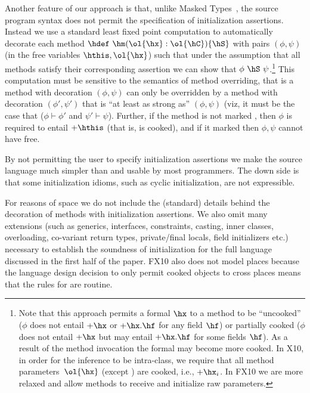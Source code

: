 Another feature of our approach is that, unlike Masked
Types~\cite{XinQi:2009}, the source program syntax does not permit the
specification of initialization assertions. Instead we use a standard
least fixed point computation to automatically decorate each method
$\hdef~\hm(\ol{\hx}:\ol{\hC})\{\hS\}$ with pairs $(\phi, \psi)$ (in the free
variables $\hthis, \ol{\hx}$) such that under the assumption that all
methods satisfy their corresponding assertion we can show that
$\phi~\hS~\psi$.\footnote{Note that this approach permits a formal $\hx$ to a
  method to be ``uncooked'' ($\phi$ does not entail $+\hx$ or
  $+\hx.\hf$ for any field $\hf$) or partially cooked ($\phi$ does not
  entail $+\hx$ but may entail $+\hx.\hf$ for some fields $\hf$). As a
  result of the method invocation the formal may become more cooked.
  In X10, in order for the inference to be intra-class, we require that all method parameters~$\ol{\hx}$ (except \this) are cooked, i.e.,
    $+\hx_i$. In FX10 we are more relaxed and allow methods to receive and initialize raw parameters.
  }
This computation must be sensitive to the semantics
of method overriding, that is a method with decoration $(\phi,\psi)$
can only be overridden by a method with decoration $(\phi',\psi')$
that is ``at least as strong as'' $(\phi,\psi)$ (viz, it must be the
case that ($\phi \vdash \phi'$ and $\psi' \vdash \psi$). Further, if
the method is not marked , then $\phi$ is required
to entail $+\hthis$ (that is,  is cooked), and if it marked
 then $\phi,\psi$ cannot have  free.



By not permitting the user to specify initialization assertions we
make the source language much simpler than \cite{XinQi:2009} and
usable by most programmers. The down side is that some initialization
idioms, such as cyclic initialization, are not expressible.

For reasons of space we do not include the (standard) details behind
the decoration of methods with initialization assertions. We also omit
many extensions (such as generics, interfaces, constraints, casting,
inner classes, overloading, co-variant return types, private/final
locals, field initializers etc.) necessary to establish the soundness
of initialization for the full language discussed in the first half of
the paper. FX10 also does not model places because the language design
decision to only permit cooked objects to cross places means that the
rules for  are routine.

